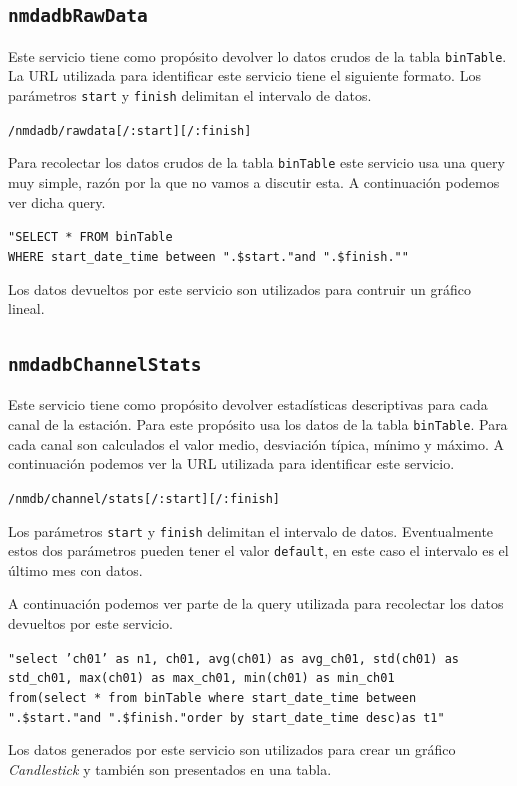 {	\subsection{\texttt{nmdadbRawData}}
		Este servicio tiene como propósito devolver lo datos crudos de la tabla \texttt{binTable}. La URL utilizada para identificar este
		servicio tiene el siguiente formato. Los parámetros \texttt{start} y \texttt{finish} delimitan el intervalo de datos.
	  		\begin{center} \texttt{/nmdadb/rawdata[/:start][/:finish]}  \end{center} 
		Para recolectar los datos crudos de la tabla \texttt{binTable} este servicio usa una query muy simple, razón por la que no vamos a
		discutir esta. A continuación podemos ver dicha query.
	  		\begin{center} \texttt{"SELECT * FROM binTable 
			  		\\	WHERE start\_date\_time between \cc".\$start."\cc and \cc".\$finish."\cc"}
			\end{center} 
		Los datos devueltos por este servicio son utilizados para contruir un gráfico lineal.
	\subsection{\texttt{nmdadbChannelStats}}
		Este servicio tiene como propósito devolver estadísticas descriptivas para cada canal de la estación. Para este propósito usa los
		datos de la tabla \texttt{binTable}. Para cada canal son calculados el valor medio, desviación típica, mínimo y máximo. A continuación
		podemos ver la URL utilizada para identificar este servicio.
	  		\begin{center} \texttt{/nmdb/channel/stats[/:start][/:finish]}  \end{center} 
		Los parámetros \texttt{start} y \texttt{finish} delimitan el intervalo de datos. Eventualmente estos dos parámetros pueden tener el
		valor \texttt{default}, en este caso el intervalo es el último mes con datos. 
		\par
		A continuación podemos ver parte de la query utilizada para recolectar los datos devueltos por este servicio.
	  		\begin{center} \texttt{"select 'ch01' as n1, ch01, avg(ch01) as avg\_ch01, std(ch01) as std\_ch01, max(ch01) as max\_ch01, min(ch01) as min\_ch01
			  		\\	from(select * from  binTable where start\_date\_time between \cc".\$start."\cc and \cc".\$finish."\cc order by start\_date\_time desc)as t1"}
			\end{center} 
		Los datos generados por este servicio son utilizados para crear un gráfico \emph{Candlestick} y también son presentados en una tabla.
}
